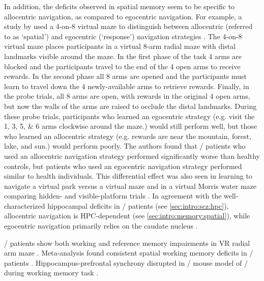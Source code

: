In addition, the deficits observed in spatial memory seem to be specific to allocentric navigation, as compared to egocentric navigation.
For example, a study by \citeauthor{Wilkins2013} used a 4-on-8 virtual maze to distinguish between allocentric (referred to as `spatial') and egocentric (`response') navigation strategies \citep{Wilkins2013}.
The 4-on-8 virtual maze places participants in a virtual 8-arm radial maze with distal landmarks visible around the maze.
In the first phase of the task 4 arms are blocked and the participants travel to the end of the 4 open arms to receive rewards.
In the second phase all 8 arms are opened and the participants must learn to travel down the 4 newly-available arms to retrieve rewards.
Finally, in the probe trials, all 8 arms are open, with rewards in the original 4 open arms, but now the walls of the arms are raised to occlude the distal landmarks.
During these probe trials, participants who learned an egocentric strategy (e.g. visit the 1, 3, 5, \& 6 arms clockwise around the maze.) would still perform well, but those who learned an allocentric strategy (e.g. rewards are near the mountain, forest, lake, and sun.) would perform poorly.
The authors found that \scz/ patients who used an allocentric navigation strategy performed significantly worse than healthy controls, but patients who used an egocentric navigation strategy performed similar to health individuals.
This differential effect was also seen in learning to navigate a virtual park versus a virtual maze \citep{Weniger2008} and in a virtual Morris water maze comparing hidden- and visible-platform trials \citep{Hanlon2006}.
In agreement with the well-characterized hippocampal deficits in \scz/ patients (see \autoref{sec:intro:scz:hpc}), allocentric navigation is \acs{HPC}-dependent (see \autoref{sec:intro:memory:spatial}), while egocentric navigation primarily relies on the caudate nucleus \citep{Hartley2003}.

\Scz/ patients show both working and reference memory impairments in VR radial arm maze \citep{Spieker2012}.
Meta-analysis found consistent spatial working memory deficits in \scz/ patients \citep{Piskulic2007}.
Hippocampus-prefrontal synchrony disrupted in \df/ mouse model of \scz/ during working memory task \citep{Sigurdsson2010}. 


